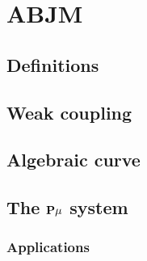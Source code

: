 
\section{ABJM}

\subsection{Definitions}

\subsection{Weak coupling}

\subsection{Algebraic curve}

\subsection{The ${\bf P}\mu$ system}

\subsubsection{Applications}